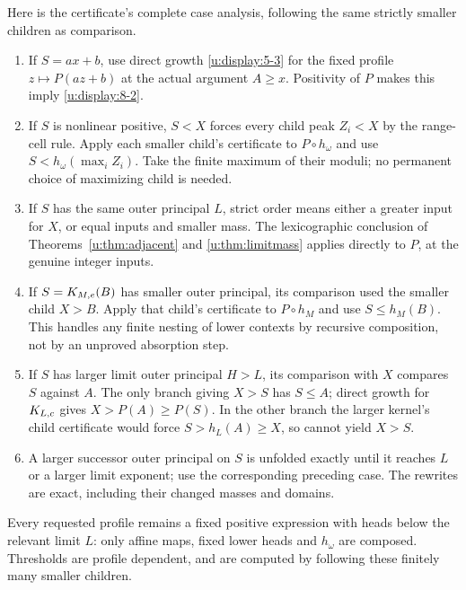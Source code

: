 Here is the certificate's complete case analysis, following the same
strictly smaller children as comparison.
\begin{enumerate}
\item If $S=ax+b$, use direct growth \eqref{u:display:5-3} for the fixed profile
$z\mapsto P(az+b)$ at the actual argument $A\ge x$. Positivity of $P$
makes this imply \eqref{u:display:8-2}.
\item If $S$ is nonlinear positive, $S<X$ forces every child peak $Z_i<X$
by the range-cell rule. Apply each smaller child's certificate to
$P\circ h_\omega$ and use $S<h_\omega(\max_i Z_i)$. Take the finite
maximum of their moduli; no permanent choice of maximizing child is needed.
\item If $S$ has the same outer principal $L$, strict order means either
a greater input for $X$, or equal inputs and smaller mass. The
lexicographic conclusion of Theorems~\ref{u:thm:adjacent} and
\ref{u:thm:limitmass} applies directly to $P$, at the genuine integer inputs.
\item If $S=K_{M,e}(B)$ has smaller outer principal, its comparison used
the smaller child $X>B$. Apply that child's certificate to
$P\circ h_M$ and use $S\le h_M(B)$. This handles any finite nesting of
lower contexts by recursive composition, not by an unproved absorption step.
\item If $S$ has larger limit outer principal $H>L$, its comparison with
$X$ compares $S$ against $A$. The only branch giving $X>S$ has $S\le A$;
direct growth for $K_{L,c}$ gives $X>P(A)\ge P(S)$. In the other branch
the larger kernel's child certificate would force
$S>h_L(A)\ge X$, so cannot yield $X>S$.
\item A larger successor outer principal on $S$ is unfolded exactly until
it reaches $L$ or a larger limit exponent; use the corresponding preceding
case. The rewrites are exact, including their changed masses and domains.
\end{enumerate}
Every requested profile remains a fixed positive expression with heads
below the relevant limit $L$: only affine maps, fixed lower heads and
$h_\omega$ are composed. Thresholds are profile dependent, and are computed
by following these finitely many smaller children.

